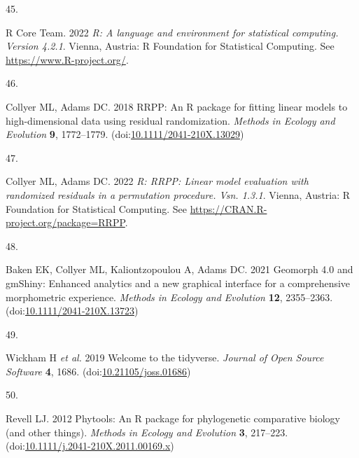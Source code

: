 \documentclass[
  11pt,
]{article}
\newlength{\cslhangindent}
\newlength{\csllabelwidth}
\newlength{\cslentryspacingunit} %
\newenvironment{CSLReferences}[2] %
 {%
  \setlength{\parindent}{0pt}
  \ifodd #1
  \let\oldpar\par
  \def\par{\hangindent=\cslhangindent\oldpar}
  \fi
  \setlength{\parskip}{#2\cslentryspacingunit}
 }%
 {}
\newcommand{\CSLLeftMargin}[1]{\parbox[t]{\csllabelwidth}{#1}}
\newcommand{\CSLRightInline}[1]{\parbox[t]{\linewidth - \csllabelwidth}{#1}\break}
\providecommand{\DIFaddbegin}{} %
\providecommand{\DIFaddend}{} %
\providecommand{\DIFdelbegin}{} %
\providecommand{\DIFdelend}{} %
\newcommand{\DIFscaledelfig}{0.5}
\newlength{\DIFdelgraphicswidth} %
\newlength{\DIFdelgraphicsheight} %
\newcommand{\DIFaddincludegraphics}[2][]{{\color{blue}\fbox{\DIFOincludegraphics[#1]{#2}}}} %
\newcommand{\DIFdelincludegraphics}[2][]{%
\sbox{\DIFdelgraphicsbox}{\DIFOincludegraphics[#1]{#2}}%
\settoboxwidth{\DIFdelgraphicswidth}{\DIFdelgraphicsbox} %
\settoboxtotalheight{\DIFdelgraphicsheight}{\DIFdelgraphicsbox} %
\scalebox{\DIFscaledelfig}{%
\parbox[b]{\DIFdelgraphicswidth}{\usebox{\DIFdelgraphicsbox}\\[-\baselineskip] \rule{\DIFdelgraphicswidth}{0em}}\llap{\resizebox{\DIFdelgraphicswidth}{\DIFdelgraphicsheight}{%
\setlength{\unitlength}{\DIFdelgraphicswidth}%
\begin{picture}(1,1)%
\thicklines\linethickness{2pt} %
{\color[rgb]{1,0,0}\put(0,0){\framebox(1,1){}}}%
{\color[rgb]{1,0,0}\put(0,0){\line( 1,1){1}}}%
{\color[rgb]{1,0,0}\put(0,1){\line(1,-1){1}}}%
\end{picture}%
}\hspace*{3pt}}} %
} %
\DeclareRobustCommand{\DIFaddbegin}{\DIFOaddbegin \let\includegraphics\DIFaddincludegraphics} %
\DeclareRobustCommand{\DIFaddend}{\DIFOaddend \let\includegraphics\DIFOincludegraphics} %
\DeclareRobustCommand{\DIFdelbegin}{\DIFOdelbegin \let\includegraphics\DIFdelincludegraphics} %
\DeclareRobustCommand{\DIFdelend}{\DIFOaddend \let\includegraphics\DIFOincludegraphics} %
\begin{document}
\begin{CSLReferences}{0}{0}
\leavevmode{}%
\CSLLeftMargin{45. }%
\CSLRightInline{R Core Team. 2022 \emph{R: A language and environment
for statistical computing. Version 4.2.1}. Vienna, Austria: R Foundation
for Statistical Computing. See \url{https://www.R-project.org/}.}

\leavevmode{}%
\CSLLeftMargin{46. }%
\DIFdelbegin %
\DIFdelend \DIFaddbegin \CSLRightInline{Collyer ML, Adams DC. 2018 RRPP: An {R} package for
fitting linear models to high-dimensional data using residual
randomization. \emph{Methods in Ecology and Evolution} \textbf{9},
1772--1779.
(doi:\href{https://doi.org/10.1111/2041-210X.13029}{10.1111/2041-210X.13029})}
\DIFaddend 

\leavevmode{}%
\CSLLeftMargin{47. }%
\CSLRightInline{Collyer ML, Adams DC. 2022 \emph{R: RRPP: Linear model
evaluation with randomized residuals in a permutation procedure. Vsn.
1.3.1}. Vienna, Austria: R Foundation for Statistical Computing. See
\url{https://CRAN.R-project.org/package=RRPP}.}

\leavevmode{}%
\CSLLeftMargin{48. }%
\CSLRightInline{Baken EK, Collyer ML, Kaliontzopoulou A, Adams DC. 2021
Geomorph 4.0 and gmShiny: Enhanced analytics and a new graphical
interface for a comprehensive morphometric experience. \emph{Methods in
Ecology and Evolution} \textbf{12}, 2355--2363.
(doi:\href{https://doi.org/10.1111/2041-210X.13723}{10.1111/2041-210X.13723})}

\leavevmode{}%
\CSLLeftMargin{49. }%
\CSLRightInline{Wickham H \emph{et al.} 2019 Welcome to the {tidyverse}.
\emph{Journal of Open Source Software} \textbf{4}, 1686.
(doi:\href{https://doi.org/10.21105/joss.01686}{10.21105/joss.01686})}

\leavevmode{}%
\CSLLeftMargin{50. }%
\DIFdelbegin %
\DIFdelend \DIFaddbegin \CSLRightInline{Revell LJ. 2012 Phytools: An {R} package for
phylogenetic comparative biology (and other things). \emph{Methods in
Ecology and Evolution} \textbf{3}, 217--223.
(doi:\href{https://doi.org/10.1111/j.2041-210X.2011.00169.x}{10.1111/j.2041-210X.2011.00169.x})}
\DIFaddend 


\end{CSLReferences}
\end{document}
